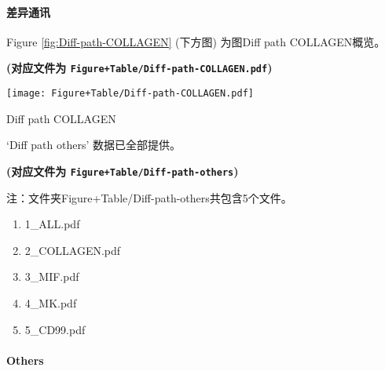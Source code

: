 \documentclass[
]{article}
\newenvironment{Shaded}{\begin{snugshade}}{\end{snugshade}}
\newcommand{\KeywordTok}[1]{\textcolor[rgb]{0.13,0.29,0.53}{\textbf{#1}}}
\newcommand{\NormalTok}[1]{#1}
\newcommand{\OperatorTok}[1]{\textcolor[rgb]{0.81,0.36,0.00}{\textbf{#1}}}
\newcommand{\StringTok}[1]{\textcolor[rgb]{0.31,0.60,0.02}{#1}}
\providecommand{\tightlist}{%
  \setlength{\itemsep}{0pt}\setlength{\parskip}{0pt}}
\begin{document}
\hypertarget{diff-chat}{%
\paragraph{差异通讯}\label{diff-chat}}

\begin{Shaded}
\end{Shaded}

Figure \ref{fig:Diff-path-COLLAGEN} (下方图) 为图Diff path COLLAGEN概览。

\textbf{(对应文件为 \texttt{Figure+Table/Diff-path-COLLAGEN.pdf})}

\def\@captype{figure}
\begin{center}
\texttt{[image: Figure+Table/Diff-path-COLLAGEN.pdf]}
\caption{Diff path COLLAGEN}\label{fig:Diff-path-COLLAGEN}
\end{center}

`Diff path others' 数据已全部提供。

\textbf{(对应文件为 \texttt{Figure+Table/Diff-path-others})}

\begin{center}\begin{tcolorbox}[colback=gray!10, colframe=gray!50, width=0.9\linewidth, arc=1mm, boxrule=0.5pt]注：文件夹Figure+Table/Diff-path-others共包含5个文件。

\begin{enumerate}\tightlist
\item 1\_ALL.pdf
\item 2\_COLLAGEN.pdf
\item 3\_MIF.pdf
\item 4\_MK.pdf
\item 5\_CD99.pdf
\end{enumerate}\end{tcolorbox}
\end{center}

\hypertarget{others}{%
\paragraph{Others}\label{others}}
\end{document}
